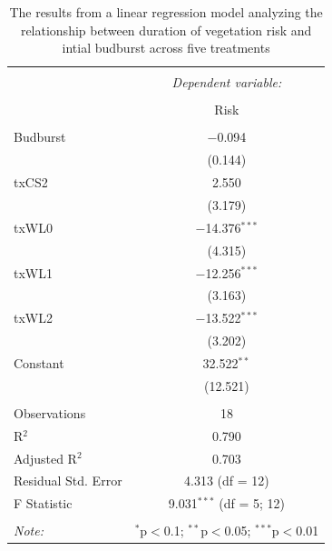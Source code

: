 \documentclass{article}\usepackage[]{graphicx}\usepackage[]{color}
\begin{document}
\begin{table}[!htbp] \centering 
  \caption{The results from a linear regression model analyzing the relationship between duration of vegetation risk and intial budburst across five treatments} 
  \label{} 
\begin{tabular}{@{\extracolsep{5pt}}lc} 
\\[-1.8ex]\hline 
\hline \\[-1.8ex] 
 & \multicolumn{1}{c}{\textit{Dependent variable:}} \\ 
\cline{2-2} 
\\[-1.8ex] & Risk \\ 
\hline \\[-1.8ex] 
 Budburst & $-$0.094 \\ 
  & (0.144) \\ 
  txCS2 & 2.550 \\ 
  & (3.179) \\ 
  txWL0 & $-$14.376$^{***}$ \\ 
  & (4.315) \\ 
  txWL1 & $-$12.256$^{***}$ \\ 
  & (3.163) \\ 
  txWL2 & $-$13.522$^{***}$ \\ 
  & (3.202) \\ 
  Constant & 32.522$^{**}$ \\ 
  & (12.521) \\ 
 \hline \\[-1.8ex] 
Observations & 18 \\ 
R$^{2}$ & 0.790 \\ 
Adjusted R$^{2}$ & 0.703 \\ 
Residual Std. Error & 4.313 (df = 12) \\ 
F Statistic & 9.031$^{***}$ (df = 5; 12) \\ 
\hline 
\hline \\[-1.8ex] 
\textit{Note:}  & \multicolumn{1}{r}{$^{*}$p$<$0.1; $^{**}$p$<$0.05; $^{***}$p$<$0.01} \\ 
\end{tabular} 
\end{table} 
\end{document}
